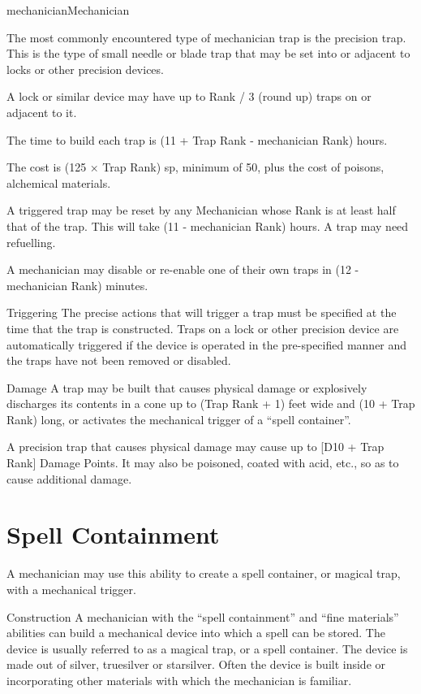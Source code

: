 \begin{Skill}[2.2]{mechanician}{Mechanician}
\begin{Description}
The most commonly encountered type of mechanician trap is the
precision trap.  This is the type of small needle or blade trap that
may be set into or adjacent to locks or other precision devices.

A lock or similar device may have up to Rank / 3 (round up) traps on
or adjacent to it.

The time to build each trap is (11 + Trap Rank - mechanician Rank)
hours.

The cost is (125 × Trap Rank) sp, minimum of 50, plus the cost of
poisons, alchemical materials.

A triggered trap may be reset by any Mechanician whose Rank is at
least half that of the trap.  This will take (11 - mechanician Rank)
hours.  A trap may need refuelling.

A mechanician may disable or re-enable one of their own traps in (12 -
mechanician Rank) minutes.

\item[Triggering] The precise actions that will trigger a trap must be
  specified at the time that the trap is constructed.  Traps on a lock
  or other precision device are automatically triggered if the device
  is operated in the pre-specified manner and the traps have not been
  removed or disabled.

\item[Damage] A trap may be built that causes physical damage or
  explosively discharges its contents in a cone up to (Trap Rank + 1)
  feet wide and (10 + Trap Rank) long, or activates the mechanical
  trigger of a “spell container”.

  A precision trap that causes physical damage may cause up to [D10 +
    Trap Rank] Damage Points.  It may also be poisoned, coated with
  acid, etc., so as to cause additional damage.

\end{Description}

\section{Spell Containment}
\label{mechanician:containment}
A mechanician may use this ability to create a spell container, or
magical trap, with a mechanical trigger.

\begin{Description}

\item[Construction] A mechanician with the “spell containment” and
  “fine materials” abilities can build a mechanical device into which
  a spell can be stored.  The device is usually referred to as a
  magical trap, or a spell container.  The device is made out of
  silver, truesilver or starsilver.  Often the device is built inside
  or incorporating other materials with which the mechanician is
  familiar.


\end{Description}
\end{Skill}

